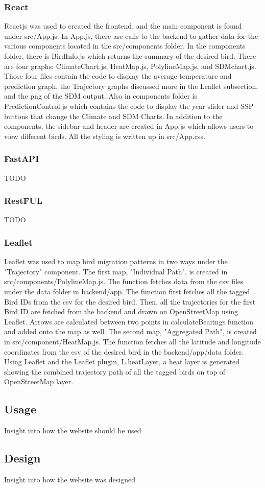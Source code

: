 \documentclass{article}
\begin{document}
\subsubsection*{React}
Reactjs was used to created the frontend, and the main component is found under src/App.js. In App.js, there are calls to the backend to gather data for the various components
located in the src/components folder. In the components folder, there is BirdInfo.js which returns the summary of the desired bird. There are four graphs: ClimateChart.js,
HeatMap.js, PolylineMap.js, and SDMchart.js. Those four files contain the code to display the average temperature and prediction graph, the Trajectory graphs discussed more 
in the Leaflet subsection, and the png of the SDM output. Also in components folder is PredictionControl.js which contains the code to display the year slider and SSP buttons that 
change the Climate and SDM Charts. In addition to the components, the sidebar and header are created in App.js which allows users to view different birds. All the styling is written 
up in src/App.css. 

\subsubsection*{FastAPI}
TODO

\subsubsection*{RestFUL}
TODO

\subsubsection*{Leaflet}
Leaflet was used to map bird migration patterns in two ways under the "Trajectory" component. The first map, "Individual Path", is created in src/components/PolylineMap.js.
The function fetches data from the csv files under the data folder in backend/app. The function first fetches all the tagged Bird IDs from the csv for the desired bird. Then,
all the trajectories for the first Bird ID are fetched from the backend and drawn on OpenStreetMap using Leaflet.  Arrows are calculated between two points in calculateBearings 
function and added onto the map as well. 
The second map, "Aggregated Path", is created in src/component/HeatMap.js. The function fetches all the latitude and longitude coordinates from the csv of the desired bird in 
the backend/app/data folder. Using Leaflet and the Leaflet plugin, L.heatLayer, a heat layer is generated showing the combined trajectory path of all the tagged birds on top of 
OpenStreetMap layer.  

\subsection{Usage}
Insight into how the website should be used

\subsection{Design}
Insight into how the website was designed
\end{document}
